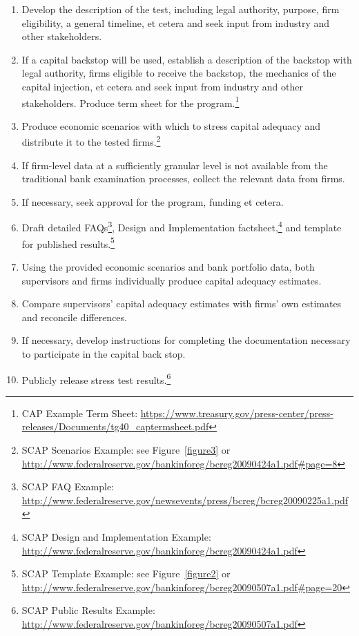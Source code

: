 \documentclass[justified, nobib]{tufte-handout2}
\begin{document}
\begin{enumerate}

\item Develop the description of the test, including legal authority, purpose, firm eligibility, a general timeline, et cetera and seek input from industry and other stakeholders.
\item If a capital backstop will be used, establish a description of the backstop with legal authority, firms eligible to receive the backstop, the mechanics of the capital injection, et cetera and seek input from industry and other stakeholders. Produce term sheet for the program.\footnote{CAP Example Term Sheet: \newline \url{https://www.treasury.gov/press-center/press-releases/Documents/tg40_captermsheet.pdf}}
\item Produce economic scenarios with which to stress capital adequacy and distribute it to the tested firms.\footnote{SCAP Scenarios Example: see Figure~\ref{figure3} or  \newline \url{http://www.federalreserve.gov/bankinforeg/bcreg20090424a1.pdf\#page=8}}
\item If firm-level data at a sufficiently granular level is not available from the traditional bank examination processes, collect the relevant data from firms. 
\item If necessary, seek approval for the program, funding et cetera.
\item Draft detailed FAQs\footnote{SCAP FAQ Example: \newline \url{http://www.federalreserve.gov/newsevents/press/bcreg/bcreg20090225a1.pdf}}, Design and Implementation factsheet,\footnote{SCAP Design and Implementation Example: \newline \url{http://www.federalreserve.gov/bankinforeg/bcreg20090424a1.pdf}} and template for published results.\footnote{SCAP Template Example: see Figure~\ref{figure2} or  \newline \url{http://www.federalreserve.gov/bankinforeg/bcreg20090507a1.pdf\#page=20}}
\item Using the provided economic scenarios and bank portfolio data, both supervisors and firms individually produce capital adequacy estimates. 
\item Compare supervisors' capital adequacy estimates with firms' own estimates and reconcile differences.
\item If necessary, develop instructions for completing the documentation necessary to participate in the capital back stop.
\item Publicly release stress test results.\footnote{SCAP Public Results Example: \newline \url{http://www.federalreserve.gov/bankinforeg/bcreg20090507a1.pdf}}

\end{enumerate}
\end{document}
